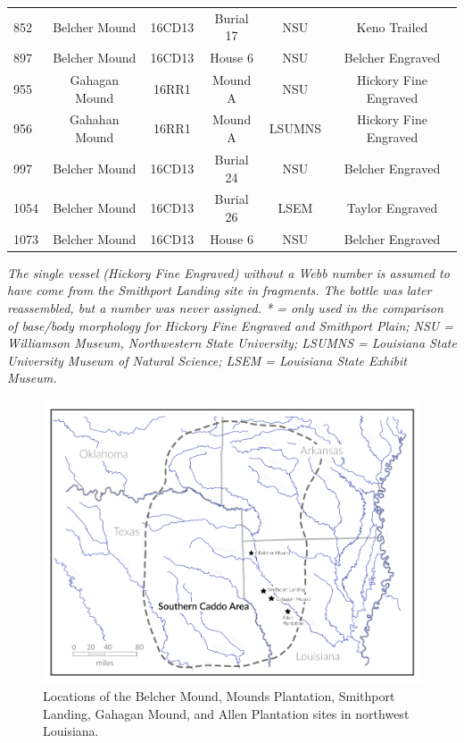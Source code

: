 \documentclass[review]{elsarticle}
\begin{document}
\begin{table}[htbp]
\begin{tabular}{lccccc}
852 & Belcher Mound & 16CD13 & Burial 17 & NSU & Keno Trailed\\
897 & Belcher Mound & 16CD13 & House 6 & NSU & Belcher Engraved\\
955 & Gahagan Mound & 16RR1 & Mound A & NSU & Hickory Fine Engraved\\
956 & Gahahan Mound & 16RR1 & Mound A & LSUMNS & Hickory Fine Engraved\\
997 & Belcher Mound & 16CD13 & Burial 24 & NSU & Belcher Engraved\\
1054 & Belcher Mound & 16CD13 & Burial 26 & LSEM & Taylor Engraved\\
1073 & Belcher Mound & 16CD13 & House 6 & NSU & Belcher Engraved\\
\bottomrule
\end{tabular}
\textit{The single vessel (Hickory Fine Engraved) without a Webb number is assumed to have come from the Smithport Landing site in fragments. The bottle was later reassembled, but a number was never assigned. * = only used in the comparison of base/body morphology for Hickory Fine Engraved and Smithport Plain; NSU = Williamson Museum, Northwestern State University; LSUMNS = Louisiana State University Museum of Natural Science; LSEM = Louisiana State Exhibit Museum.}
\label{tab:Tbl1}
\end{table}

\begin{figure}[ht]\centering
\includegraphics[width=\linewidth]{SCA-LA}
\caption{Locations of the Belcher Mound, Mounds Plantation, Smithport Landing, Gahagan Mound, and Allen Plantation sites in northwest Louisiana.}
\label{fig:FigMap}
\end{figure}
\end{document}
